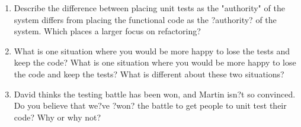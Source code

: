 \begin{enumerate}
\begin{enumerate}
			\item Describe the difference between placing unit tests as the "authority" of the system differs from placing the functional code as the ?authority? of the system. Which places a larger focus on refactoring?


			\item What is one situation where you would be more happy to lose the tests and keep the code? What is one situation where you would be more happy to lose the code and keep the tests? What is different about these two situations?


			\item David thinks the testing battle has been won, and Martin isn?t so convinced. Do you believe that we?ve ?won? the battle to get people to unit test their code? Why or why not?


		\end{enumerate}

\end{enumerate}



